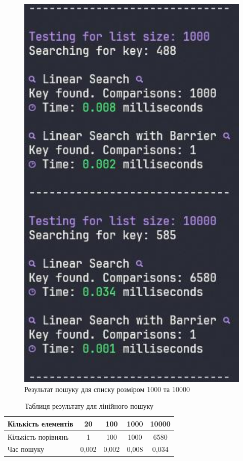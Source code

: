 \begin{figure}[h!]
  \centering
  \includegraphics[width=13cm]{reports/algos/lab9/assets/2.jpeg}
  \caption{Результат пошуку для списку розміром 1000 та 10000}
\end{figure}


\clearpage
\begin{table}[htbp]
\caption{Таблиця результату для лінійного пошуку}
\begin{tabular}{|l|c|c|c|c|}
\hline
Кількість елементів & 20    & 100   & 1000  & 10000 \\ \hline
Кількість порівнянь & 1     & 100   & 1000  & 6580  \\ \hline
Час пошуку          & 0,002 & 0,002 & 0,008 & 0,034 \\ \hline
\end{tabular}
\end{table}

